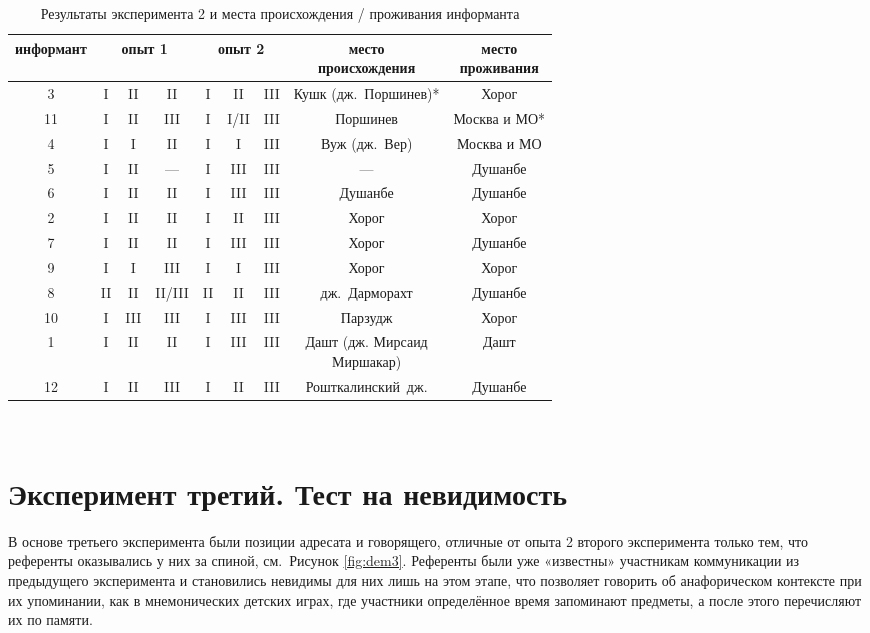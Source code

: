 \begin{table}
 \centering
 \caption{Результаты эксперимента 2 и места происхождения / проживания информанта}
 \smallskip
 \label{tab:dem4}
 \begin{tabular}{c|ccc|ccc|cc} \toprule
 информант & \multicolumn{3}{c|}{опыт 1} & \multicolumn{3}{c|}{опыт 2} & \makecell{место\\ происхождения} & \makecell{место\\ проживания} \\ \midrule
 3 & I & II & II & I & II & III & Кушк (дж.~Поршинев)* & Хорог \\
 11 & I & II & III & I & I/II & III & Поршинев & Москва и МО* \\
 4 & I & I & II & I & I & III & Вуж (дж.~Вер) & Москва и МО \\
 5 & I & II & — & I & III & III & — & Душанбе \\
 6 & I & II & II & I & III & III & Душанбе & Душанбе \\
 2 & I & II & II & I & II & III & Хорог & Хорог \\
 7 & I & II & II & I & III & III & Хорог & Душанбе \\
 9 & I & I & III & I & I & III & Хорог & Хорог \\
 8 & II & II & II/III & II & II & III & дж.~Дарморахт & Душанбе \\
 10 & I & III & III & I & III & III & Парзудж & Хорог \\
 1 & I & II & II & I & III & III & \makecell{Дашт (дж. Мирсаид\\ Миршакар)} & Дашт \\
 12 & I & II & III & I & II & III & Рошткалинский~дж. & Душанбе\\ \bottomrule
 \end{tabular}
 \\
 \medskip
\end{table}

\section{Эксперимент третий. Тест на невидимость} \label{dem-exp3}

В основе третьего эксперимента были позиции адресата и говорящего, отличные от опыта 2 второго эксперимента только тем, что референты оказывались у них за спиной, см.~Рисунок \ref{fig:dem3}. Референты были уже «известны» участникам коммуникации из предыдущего эксперимента и становились невидимы для них лишь на этом этапе, что позволяет говорить об анафорическом контексте при их упоминании, как в мнемонических детских играх, где участники определённое время запоминают предметы, а после этого перечисляют их по памяти.

